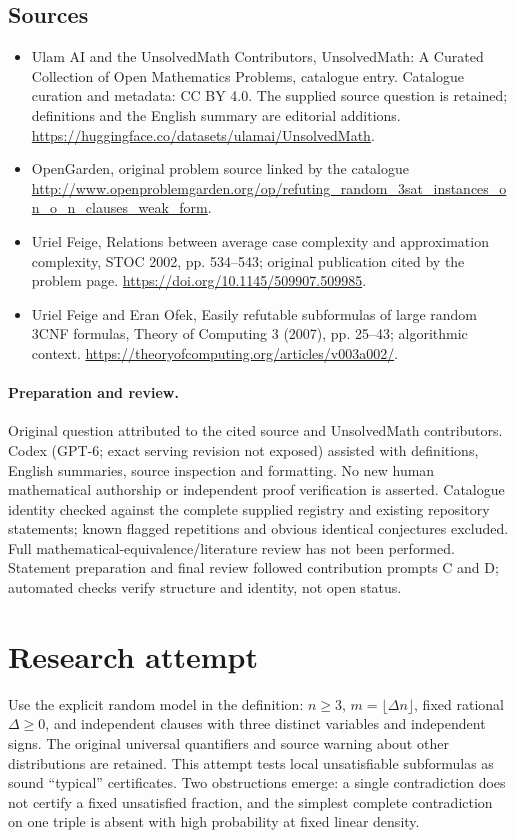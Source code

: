 \documentclass[11pt]{article}
\begin{document}
\subsection{Sources}
\begin{itemize}
\item[S1] Ulam AI and the UnsolvedMath Contributors, UnsolvedMath: A Curated Collection of Open Mathematics Problems, catalogue entry. Catalogue curation and metadata: CC BY 4.0. The supplied source question is retained; definitions and the English summary are editorial additions.
\url{https://huggingface.co/datasets/ulamai/UnsolvedMath}.
\item[S2] OpenGarden, original problem source linked by the catalogue
\url{http://www.openproblemgarden.org/op/refuting_random_3sat_instances_on_o_n_clauses_weak_form}.
\item[S3] Uriel Feige, Relations between average case complexity and approximation complexity, STOC 2002, pp. 534--543; original publication cited by the problem page.
\url{https://doi.org/10.1145/509907.509985}.
\item[S4] Uriel Feige and Eran Ofek, Easily refutable subformulas of large random 3CNF formulas, Theory of Computing 3 (2007), pp. 25--43; algorithmic context.
\url{https://theoryofcomputing.org/articles/v003a002/}.
\end{itemize}
\paragraph{Preparation and review.}
Original question attributed to the cited source and UnsolvedMath contributors. Codex (GPT-6; exact serving revision not exposed) assisted with definitions, English summaries, source inspection and formatting. No new human mathematical authorship or independent proof verification is asserted. Catalogue identity checked against the complete supplied registry and existing repository statements; known flagged repetitions and obvious identical conjectures excluded. Full mathematical-equivalence/literature review has not been performed. Statement preparation and final review followed contribution prompts C and D; automated checks verify structure and identity, not open status.
\label{end:statement}


\section{Research attempt}
Use the explicit random model in the definition: $n\ge3$, $m=\lfloor\Delta n\rfloor$, fixed rational $\Delta\ge0$, and independent clauses with three distinct variables and independent signs. The original universal quantifiers and source warning about other distributions are retained. This attempt tests local unsatisfiable subformulas as sound ``typical'' certificates. Two obstructions emerge: a single contradiction does not certify a fixed unsatisfied fraction, and the simplest complete contradiction on one triple is absent with high probability at fixed linear density.
\end{document}

